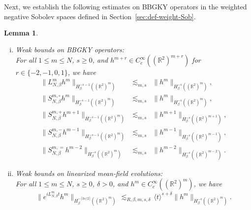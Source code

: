 \documentclass[a4paper,11pt,reqno,noindent]{amsart}
\theoremstyle{plain}
\newtheorem{lem}{Lemma}[section]
\numberwithin{equation}{section}
\newcommand{\R}{\mathbb R}
\newcommand{\3}{|\!|\!|}
\begin{document}
Next, we establish the following estimates on BBGKY operators in the weighted negative Sobolev spaces defined in Section~\ref{sec:def-weight-Sob}.

\begingroup\allowdisplaybreaks
\begin{lem}\label{lem:prelest-LS-re}$ $
\begin{enumerate}[(i)]
\item \emph{Weak bounds on BBGKY operators:}\\
For all $1\le m\le N$, $s\ge0$, and $h^{m+r}\in C^\infty_c((\R^2)^{m+r})$ for $r\in\{-2,-1,0,1\}$, we have
\begin{eqnarray*}
\|L^{m}_{N,\beta}h^{m}\|_{H^{-s-1}_\beta((\R^2)^m)}&\lesssim_{m,s}&\|h^{m}\|_{H^{-s}_\beta((\R^2)^{m})},\\
\|S^{m,\circ}_{N,\beta}h^{m}\|_{H^{-s-1}_\beta((\R^2)^m)}&\lesssim_{m,s}&\|h^{m}\|_{H^{-s}_\beta((\R^2)^{m})},\\
\|S^{m,+}_{N,\beta}h^{m+1}\|_{H^{-s-1}_\beta((\R^2)^m)}&\lesssim_{m,s}&\|h^{m+1}\|_{H^{-s}_\beta((\R^2)^{m+1})},\\
\|S^{m,-}_{N,\beta}h^{m-1}\|_{H^{-s-1}_\beta((\R^2)^m)}&\lesssim_{m,s}&\|h^{m-1}\|_{H^{-s}_\beta((\R^2)^{m-1})},\\
\|S^{m,=}_{N,\beta}h^{m-2}\|_{H^{-s}_\beta((\R^2)^m)}&\lesssim_{m,s}&\|h^{m-2}\|_{H^{-s}_\beta((\R^2)^{m-2})}.
\end{eqnarray*}
\item \emph{Weak bounds on linearized mean-field evolutions:}\\
For all $1\le m\le N$, $s\ge0$, $\delta>0$, and $h^m\in C^\infty_c((\R^2)^{m})$, we have
\[\|e^{iL_{N,\beta}^mt}h^m\|_{H^{-\lceil3s/2\rceil}_\beta((\R^2)^m)}\,\lesssim_{R,\beta,m,s,\delta}\,\langle t\rangle^{s+\delta}\|h^m\|_{H^{-s}_\beta((\R^2)^m)}.\]
\end{enumerate}
\end{lem}
\end{document}
